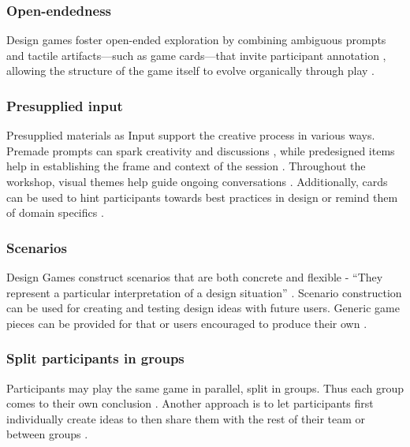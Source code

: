 \documentclass[draft,twoside]{vutinfth}
\begin{document}
            \subsubsection{Open-endedness}
            Design games foster open-ended exploration by combining ambiguous prompts \cite{vaajakallioDesignGamesCodesign2014} 
            and tactile artifacts—such as game cards—that invite participant annotation \cite{hatamiFacilitatingServiceInteractions2016}, 
            allowing the structure of the game itself to evolve organically through play \cite{fikarGroundedTheoryZur2023}.

            \subsubsection{Presupplied input}
            Presupplied materials as Input support the creative process in various ways. 
            Premade prompts can spark creativity and discussions \cite{brandtDesigningExploratoryDesign2006, nymarkernstsenTechnologyCardsDesign2023}, 
            while predesigned items help in establishing the frame and context of the session \cite{vaajakallioDesignGamesCodesign2014, gudiksenExplicatingStakeholderCriteria2017}. 
            Throughout the workshop, visual themes help guide ongoing conversations \cite{hatamiFacilitatingServiceInteractions2016}. 
            Additionally, cards can be used to hint participants towards best practices in design or 
            remind them of domain specifics \cite{royCardbasedDesignTools2019, nymarkernstsenTechnologyCardsDesign2023}.
            
            \subsubsection{Scenarios}
            Design Games construct scenarios that are both concrete and flexible - ``They represent a particular interpretation 
            of a design situation'' \cite{brandtFacilitatingCollaborationDesign2004a}. Scenario construction can be used 
            for creating and testing design ideas with future users. Generic game pieces can be provided for that or users 
            encouraged to produce their own \cite{brandtDesigningExploratoryDesign2006}. 

            \subsubsection{Split participants in groups}
            Participants may play the same game in parallel, split in groups. Thus each group comes to their own conclusion \cite{eriksenTakingDesignGames2014}. 
            Another approach is to let participants first individually create ideas to then share them with the rest of their team or 
            between groups \cite{bunaesRulesPlayBalance2024}. 
\end{document}
